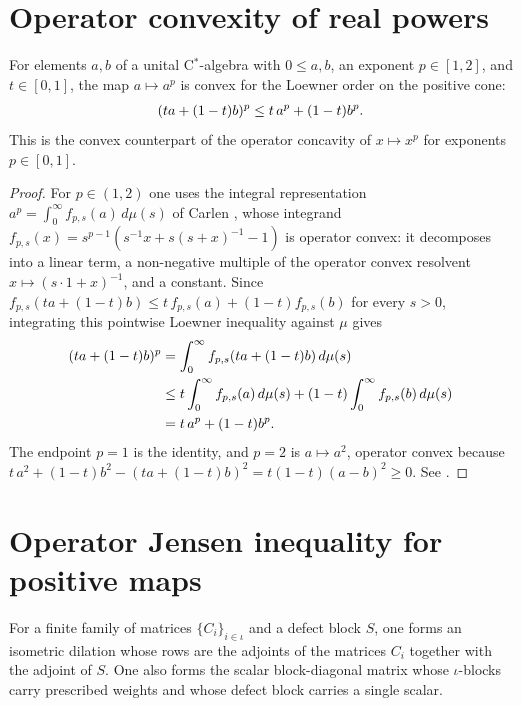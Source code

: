 \section{Operator convexity of real powers}

\begin{theorem}%
    \label{thm:operator_convexOn_rpow}
    \leanok
    For elements $a,b$ of a unital C${}^\ast$-algebra with $0\le a,b$, an
    exponent $p\in[1,2]$, and $t\in[0,1]$, the map $a\mapsto a^p$ is convex for
    the Loewner order on the positive cone:
    \begin{align}
        (ta+(1-t)b)^p
        \le t\,a^p+(1-t)b^p.
        \notag
    \end{align}
    This is the convex counterpart of the operator concavity of
    $x\mapsto x^p$ for exponents $p\in[0,1]$.
\end{theorem}

\begin{proof}\leanok
    For $p\in(1,2)$ one uses the integral representation
    $a^p=\int_0^\infty f_{p,s}(a)\,d\mu(s)$ of Carlen
    \cite[Lemma~2.8]{carlen2010}, whose integrand
    $f_{p,s}(x)=s^{p-1}(s^{-1}x+s(s+x)^{-1}-1)$ is operator convex:
    it decomposes into a linear term, a non-negative multiple of the operator
    convex resolvent $x\mapsto(s\cdot1+x)^{-1}$, and a constant.
    Since
    $f_{p,s}(ta+(1-t)b)\le t\,f_{p,s}(a)+(1-t)f_{p,s}(b)$ for every $s>0$,
    integrating this pointwise Loewner inequality against $\mu$ gives
    \begin{align}
        (ta+(1-t)b)^p
        &=\int_0^\infty f_{p,s}(ta+(1-t)b)\,d\mu(s) \notag\\
        &\le
        t\int_0^\infty f_{p,s}(a)\,d\mu(s)
        +(1-t)\int_0^\infty f_{p,s}(b)\,d\mu(s) \notag\\
        &=t\,a^p+(1-t)b^p.
        \notag
    \end{align}
    The endpoint $p=1$ is the identity, and $p=2$ is $a\mapsto a^2$, operator
    convex because
    $t\,a^2+(1-t)b^2-(ta+(1-t)b)^2=t(1-t)(a-b)^2\ge0$.
    See \cite[Chapter~V]{Bhatia1997Matrix}.
\end{proof}

\section{Operator Jensen inequality for positive maps}

\begin{definition}\label{def:operator_jensen_povm_aux}
    \leanok
    For a finite family of matrices $\{C_i\}_{i\in\iota}$ and a defect block
    $S$, one forms an isometric dilation whose rows are the adjoints of the
    matrices $C_i$ together with the adjoint of $S$. One also forms the scalar
    block-diagonal matrix whose $\iota$-blocks carry prescribed weights and
    whose defect block carries a single scalar.
\end{definition}

